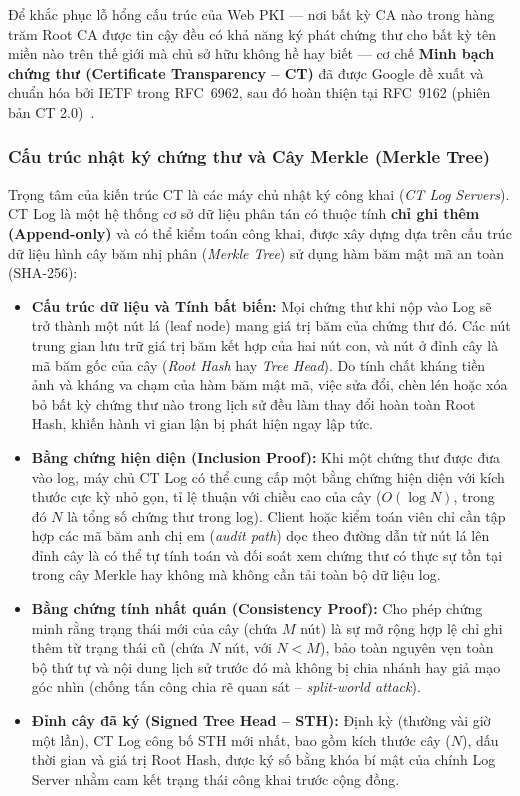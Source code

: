 Để khắc phục lỗ hổng cấu trúc của Web PKI --- nơi bất kỳ CA nào trong hàng trăm Root CA được tin cậy đều có khả năng ký phát chứng thư cho bất kỳ tên miền nào trên thế giới mà chủ sở hữu không hề hay biết --- cơ chế \textbf{Minh bạch chứng thư (Certificate Transparency -- CT)} đã được Google đề xuất và chuẩn hóa bởi IETF trong RFC~6962, sau đó hoàn thiện tại RFC~9162 (phiên bản CT 2.0)~\cite{rfc9162}.

\subsubsection{Cấu trúc nhật ký chứng thư và Cây Merkle (Merkle Tree)}
Trọng tâm của kiến trúc CT là các máy chủ nhật ký công khai (\textit{CT Log Servers}). CT Log là một hệ thống cơ sở dữ liệu phân tán có thuộc tính \textbf{chỉ ghi thêm (Append-only)} và có thể kiểm toán công khai, được xây dựng dựa trên cấu trúc dữ liệu hình cây băm nhị phân (\textit{Merkle Tree}) sử dụng hàm băm mật mã an toàn (SHA-256):
\begin{itemize}
    \item \textbf{Cấu trúc dữ liệu và Tính bất biến:} Mọi chứng thư khi nộp vào Log sẽ trở thành một nút lá (leaf node) mang giá trị băm của chứng thư đó. Các nút trung gian lưu trữ giá trị băm kết hợp của hai nút con, và nút ở đỉnh cây là mã băm gốc của cây (\textit{Root Hash} hay \textit{Tree Head}). Do tính chất kháng tiền ảnh và kháng va chạm của hàm băm mật mã, việc sửa đổi, chèn lén hoặc xóa bỏ bất kỳ chứng thư nào trong lịch sử đều làm thay đổi hoàn toàn Root Hash, khiến hành vi gian lận bị phát hiện ngay lập tức.
    \item \textbf{Bằng chứng hiện diện (Inclusion Proof):} Khi một chứng thư được đưa vào log, máy chủ CT Log có thể cung cấp một bằng chứng hiện diện với kích thước cực kỳ nhỏ gọn, tỉ lệ thuận với chiều cao của cây ($O(\log N)$, trong đó $N$ là tổng số chứng thư trong log). Client hoặc kiểm toán viên chỉ cần tập hợp các mã băm anh chị em (\textit{audit path}) dọc theo đường dẫn từ nút lá lên đỉnh cây là có thể tự tính toán và đối soát xem chứng thư có thực sự tồn tại trong cây Merkle hay không mà không cần tải toàn bộ dữ liệu log.
    \item \textbf{Bằng chứng tính nhất quán (Consistency Proof):} Cho phép chứng minh rằng trạng thái mới của cây (chứa $M$ nút) là sự mở rộng hợp lệ chỉ ghi thêm từ trạng thái cũ (chứa $N$ nút, với $N < M$), bảo toàn nguyên vẹn toàn bộ thứ tự và nội dung lịch sử trước đó mà không bị chia nhánh hay giả mạo góc nhìn (chống tấn công chia rẽ quan sát -- \textit{split-world attack}).
    \item \textbf{Đỉnh cây đã ký (Signed Tree Head -- STH):} Định kỳ (thường vài giờ một lần), CT Log công bố STH mới nhất, bao gồm kích thước cây ($N$), dấu thời gian và giá trị Root Hash, được ký số bằng khóa bí mật của chính Log Server nhằm cam kết trạng thái công khai trước cộng đồng.
\end{itemize}


